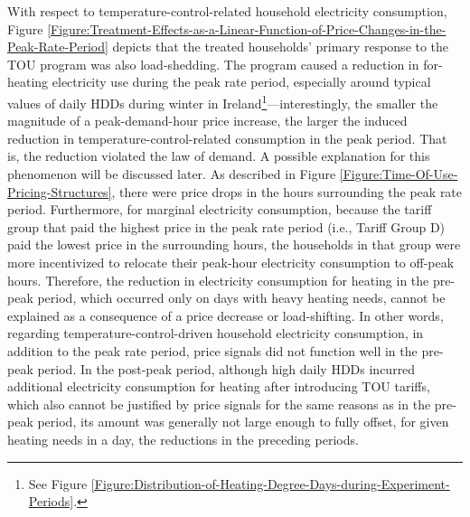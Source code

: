 With respect to temperature-control-related household electricity consumption, Figure \ref{Figure:Treatment-Effects-as-a-Linear-Function-of-Price-Changes-in-the-Peak-Rate-Period} depicts that the treated households' primary response to the TOU program was also load-shedding. The program caused a reduction in for-heating electricity use during the peak rate period, especially around typical values of daily HDDs during winter in Ireland\footnote{See Figure \ref{Figure:Distribution-of-Heating-Degree-Days-during-Experiment-Periods}.}---interestingly, the smaller the magnitude of a peak-demand-hour price increase, the larger the induced reduction in temperature-control-related consumption in the peak period. That is, the reduction violated the law of demand. A possible explanation for this phenomenon will be discussed later. As described in Figure \ref{Figure:Time-Of-Use-Pricing-Structures}, there were price drops in the hours surrounding the peak rate period. Furthermore, for marginal electricity consumption, because the tariff group that paid the highest price in the peak rate period (i.e., Tariff Group D) paid the lowest price in the surrounding hours, the households in that group were more incentivized to relocate their peak-hour electricity consumption to off-peak hours. Therefore, the reduction in electricity consumption for heating in the pre-peak period, which occurred only on days with heavy heating needs, cannot be explained as a consequence of a price decrease or load-shifting. In other words, regarding temperature-control-driven household electricity consumption, in addition to the peak rate period, price signals did not function well in the pre-peak period. In the post-peak period, although high daily HDDs incurred additional electricity consumption for heating after introducing TOU tariffs, which also cannot be justified by price signals for the same reasons as in the pre-peak period, its amount was generally not large enough to fully offset, for given heating needs in a day, the reductions in the preceding periods.

